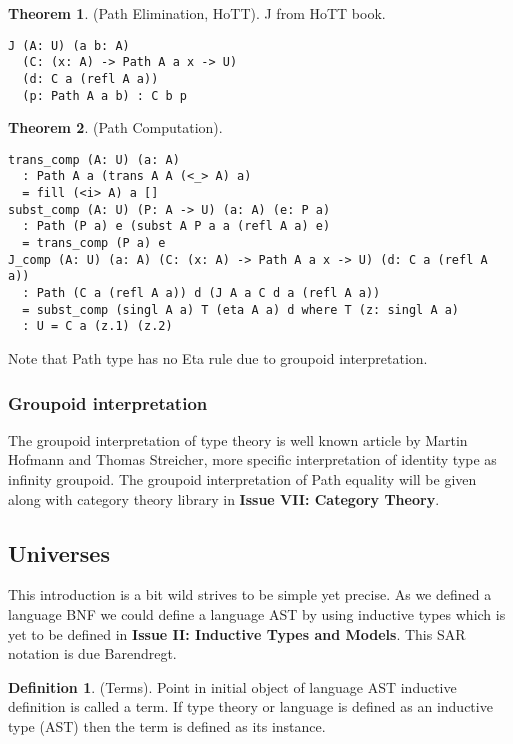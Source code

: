 \documentclass[twoside]{article}
\theoremstyle{definition}
\newtheorem{theorem}{Theorem}
\newtheorem{definition}{Definition}
\begin{document}
\begin{theorem} (Path Elimination, HoTT).
J from HoTT book.
\begin{lstlisting}
J (A: U) (a b: A)
  (C: (x: A) -> Path A a x -> U)
  (d: C a (refl A a))
  (p: Path A a b) : C b p
\end{lstlisting}
\end{theorem}

\begin{theorem} (Path Computation).
\begin{lstlisting}
trans_comp (A: U) (a: A)
  : Path A a (trans A A (<_> A) a)
  = fill (<i> A) a []
subst_comp (A: U) (P: A -> U) (a: A) (e: P a)
  : Path (P a) e (subst A P a a (refl A a) e)
  = trans_comp (P a) e
J_comp (A: U) (a: A) (C: (x: A) -> Path A a x -> U) (d: C a (refl A a))
  : Path (C a (refl A a)) d (J A a C d a (refl A a))
  = subst_comp (singl A a) T (eta A a) d where T (z: singl A a)
  : U = C a (z.1) (z.2)
\end{lstlisting}
\end{theorem}

Note that  Path type has no Eta rule due to groupoid interpretation.

\subsubsection*{Groupoid interpretation}

The groupoid interpretation of type theory is well known article by Martin Hofmann and Thomas Streicher,
more specific interpretation of identity type as infinity groupoid.
The groupoid interpretation of Path equality will be given along with category theory library
in {\bf Issue VII: Category Theory}.

\subsection{Universes}

This introduction is a bit wild strives to be simple yet precise.
As we defined a language BNF we could define a language AST by
using inductive types which is yet to be defined
in {\bf Issue II: Inductive Types and Models}. This SAR notation is due Barendregt.

\begin{definition} (Terms). Point in initial object of language AST
inductive definition is called a term. If type theory or language is defined as
an inductive type (AST) then the term is defined as its instance.
\end{definition}
\end{document}
